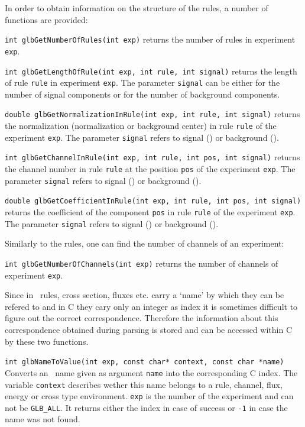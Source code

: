 In order to obtain information on the structure of the rules, 
a number of functions are provided:
\begin{function}
{\tt int glbGetNumberOfRules(int exp)} returns the number of
rules in experiment {\tt exp}.
\end{function}
\begin{function}
{\tt int glbGetLengthOfRule(int exp, int rule, int signal)} returns
the length of rule {\tt rule} in experiment {\tt exp}. The parameter
{\tt signal} can be either  for the number of signal
components or  for the number of background components.
\end{function}
\begin{function}
{\tt double glbGetNormalizationInRule(int exp, int rule, int signal)}
returns the normalization (normalization or background center)
in rule {\tt rule} of the experiment {\tt exp}.
The parameter {\tt signal} refers to signal () or background
().
\end{function}
\begin{function}
{\tt int glbGetChannelInRule(int exp, int rule, int pos, int signal)}
returns the channel number in rule {\tt rule} at the position {\tt pos}
of the experiment {\tt exp}.
The parameter {\tt signal} refers to signal () or background
().
\end{function}
\begin{function}
{\tt double glbGetCoefficientInRule(int exp, int rule, int pos, int signal)}
returns the coefficient of the component {\tt pos} in rule {\tt rule} 
of the experiment {\tt exp}.
The parameter {\tt signal} refers to signal () or background
().
\end{function}
%
Similarly to the rules, one can find the number of channels of an experiment:
\begin{function}
{\tt int glbGetNumberOfChannels(int exp)} returns the number of 
channels of experiment {\tt exp}.
\end{function} 


Since in \AEDL\ rules, cross section, fluxes etc. carry a `name' by
which they can be refered to and in C they cary only an integer as
index it is sometimes difficult to figure out the correct correspondence.
Therefore the information about this correspondence obtained during
parsing is stored and can be accessed within C by these two functions.
\begin{function}
{\tt int glbNameToValue(int exp, const char* context, const char *name)}
Converts an \AEDL\ name given as argument {\tt name} into the corresponding
C index. The variable {\tt context} describes wether this name belongs
to a rule, channel, flux, energy or cross type environment. {\tt exp}
is the number of the experiment and can not be {\tt GLB\_ALL}. It returns
either the index in case of success or {\tt -1} in case the name was not
found. 
\end{function}

